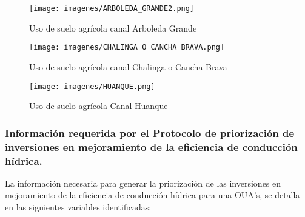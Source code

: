 \documentclass[]{article}
\begin{document}
\begin{figure}[H]
\centering
\texttt{[image: imagenes/ARBOLEDA\_GRANDE2.png]}
\caption{Uso de suelo agrícola canal Arboleda Grande}
\end{figure}

\begin{figure}[H]
\centering
\texttt{[image: imagenes/CHALINGA O CANCHA BRAVA.png]}
\caption{Uso de suelo agrícola canal Chalinga o Cancha Brava}
\end{figure}

\begin{figure}[H]
\centering
\texttt{[image: imagenes/HUANQUE.png]}
\caption{Uso de suelo agrícola Canal Huanque}
\end{figure}



  
\subsubsection{Información requerida por el Protocolo de priorización de inversiones en mejoramiento de la eficiencia de conducción hídrica.}

La información necesaria para generar la priorización de las inversiones en mejoramiento de la eficiencia de conducción hídrica para una OUA's, se detalla en las siguientes variables identificadas:
\end{document}
